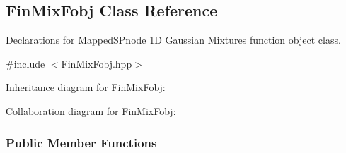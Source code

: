 \hypertarget{classFinMixFobj}{\subsection{\-Fin\-Mix\-Fobj \-Class \-Reference}
\label{classFinMixFobj}
}


\-Declarations for \-Mapped\-S\-Pnode 1\-D \-Gaussian \-Mixtures function object class.  




{\ttfamily \#include $<$\-Fin\-Mix\-Fobj.\-hpp$>$}



\-Inheritance diagram for \-Fin\-Mix\-Fobj\-:


\-Collaboration diagram for \-Fin\-Mix\-Fobj\-:
\subsubsection*{\-Public \-Member \-Functions}
